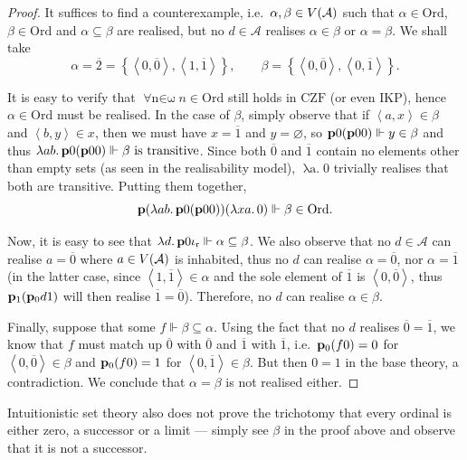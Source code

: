 \documentclass[12pt,openany]{book}
\theoremstyle{plain}
\theoremstyle{definition}
\newcommand\tuple[1]{\left\langle #1 \right\rangle}
\newcommand\opA[1]{\mathop{\forall #1}}
\newcommand\oplam[1]{\mathop{\lambda #1.}}
\newcommand\CZF{\mathrm{CZF}}
\newcommand\IKP{\mathrm{IKP}}
\newcommand\Ord{\mathrm{Ord}}
\newcommand\bp{\mathbf{p}}
\newcommand\ior{\iota_\textup{r}}
\begin{document}
\begin{proof}
  It suffices to find a counterexample, i.e.\ $\alpha, \beta \in V\mleft(\mathcal{A}\mright)$ such that $\alpha \in \Ord$, $\beta \in \Ord$ and $\alpha \subseteq \beta$ are realised, but no $d \in \mathcal{A}$ realises $\alpha \in \beta$ or $\alpha = \beta$. We shall take
  \[\alpha = \overline{2} = \left\{\tuple{0, \overline{0}}, \tuple{1, \overline{1}}\right\}, \qquad \beta = \left\{\tuple{0, \overline{0}}, \tuple{0, \overline{1}}\right\}.\]

  It is easy to verify that $\opA{n \in \omega} n \in \Ord$ still holds in $\CZF$ (or even $\IKP$), hence $\alpha \in \Ord$ must be realised. In the case of $\beta$, simply observe that if $\tuple{a, x} \in \beta$ and $\tuple{b, y} \in x$, then we must have $x = \overline{1}$ and $y = \varnothing$, so $\bp 0 \mleft(\bp 00\mright) \Vdash y \in \beta$ and thus $\oplam{ab} \bp 0 \mleft(\bp 00\mright) \Vdash \text{$\beta$ is transitive}$. Since both $\overline{0}$ and $\overline{1}$ contain no elements other than empty sets (as seen in the realisability model), $\oplam{a} 0$ trivially realises that both are transitive. Putting them together,
  \[\bp \mleft(\oplam{ab} \bp 0 \mleft(\bp 00\mright)\mright) \mleft(\oplam{xa} 0\mright) \Vdash \beta \in \Ord.\]

  Now, it is easy to see that $\oplam{d} \bp 0 \ior \Vdash \alpha \subseteq \beta$. We also observe that no $d \in \mathcal{A}$ can realise $a = \overline{0}$ where $a \in V\mleft(\mathcal{A}\mright)$ is inhabited, thus no $d$ can realise $\alpha = \overline{0}$, nor $\alpha = \overline{1}$ (in the latter case, since $\tuple{1, \overline{1}} \in \alpha$ and the sole element of $\overline{1}$ is $\tuple{0, \overline{0}}$, thus $\bp_1 \mleft(\bp_0 d 1\mright)$ will then realise $\overline{1} = \overline{0}$). Therefore, no $d$ can realise $\alpha \in \beta$.

  Finally, suppose that some $f \Vdash \beta \subseteq \alpha$. Using the fact that no $d$ realises $\overline{0} = \overline{1}$, we know that $f$ must match up $\overline{0}$ with $\overline{0}$ and $\overline{1}$ with $\overline{1}$, i.e.\ $\bp_0 \mleft(f0\mright) = 0$ for $\tuple{0, \overline{0}} \in \beta$ and $\bp_0 \mleft(f0\mright) = 1$ for $\tuple{0, \overline{1}} \in \beta$. But then $0 = 1$ in the base theory, a contradiction. We conclude that $\alpha = \beta$ is not realised either.
\end{proof}

Intuitionistic set theory also does not prove the trichotomy that every ordinal is either zero, a successor or a limit --- simply see $\beta$ in the proof above and observe that it is not a successor.
\end{document}
